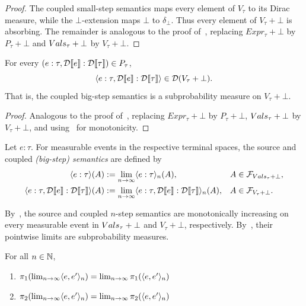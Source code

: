 \begin{proof}
The coupled small-step semantics maps every element of $V_\tau$ to
its Dirac measure, while the $\bot$-extension maps $\bot$ to
$\delta_\bot$. Thus every element of $V_\tau+\bot$ is absorbing. The
remainder is analogous to the proof of~, replacing
$Expr_\tau+\bot$ by $P_\tau+\bot$ and $Vals_\tau+\bot$ by
$V_\tau+\bot$.
\end{proof}

\begin{lemma}
\label{lem:bigstep-coupling-well-defined}
For every $(e:\tau,\mathcal{D}\llbracket e \rrbracket:\mathcal{D}\llbracket \tau \rrbracket)\in P_\tau$,
\[
\langle e:\tau,\mathcal{D}\llbracket e \rrbracket:\mathcal{D}\llbracket \tau \rrbracket \rangle
\in\mathcal D(V_\tau+\bot).
\]
That is, the coupled big-step semantics is a subprobability measure on
$V_\tau+\bot$.
\end{lemma}

\begin{proof}
Analogous to the proof of~, replacing
$Expr_\tau+\bot$ by $P_\tau+\bot$, $Vals_\tau+\bot$ by
$V_\tau+\bot$, and using~ for
monotonicity.
\end{proof}

\begin{definition}
Let $e:\tau$. For measurable events in the respective terminal spaces,
the source and coupled \emph{(big-step) semantics} are defined by
\begin{align*}
\langle e:\tau \rangle(A)
&:= \lim_{n\to\infty}\langle e:\tau \rangle_{n}(A),
&& A\in\mathcal F_{Vals_\tau+\bot},
\\
\langle e:\tau,\mathcal{D}\llbracket e \rrbracket:\mathcal{D}\llbracket \tau \rrbracket \rangle(A)
&:= \lim_{n\to\infty}
\langle e:\tau,\mathcal{D}\llbracket e \rrbracket:\mathcal{D}\llbracket \tau \rrbracket \rangle_{n}(A),
&& A\in\mathcal F_{V_\tau+\bot}.
\end{align*}
\end{definition}

By~, the source and coupled
$n$-step semantics are monotonically increasing on every measurable
event in $Vals_\tau+\bot$ and $V_\tau+\bot$, respectively.
By~,
their pointwise limits are subprobability measures.

\begin{lemma}
	For all $n \in \mathbb{N}$,
	\begin{enumerate}
		\item $\pi_1(\lim_{n \to \infty} \langle e,e' \rangle_{n}) = \lim_{n \to \infty} \pi_1(\langle e,e' \rangle_{n})$
		\item $\pi_2(\lim_{n \to \infty} \langle e,e' \rangle_{n}) = \lim_{n \to \infty} \pi_2(\langle e,e' \rangle_{n})$ 
	\end{enumerate}
\end{lemma}

